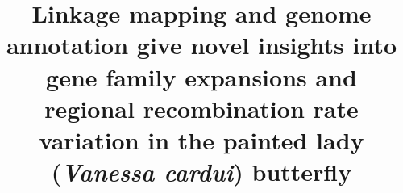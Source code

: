 \documentclass[twocolumn]{bmcart}%
\begin{document}
\begin{frontmatter}
\begin{fmbox}
\title{
{
 Linkage mapping and genome annotation give novel insights into gene family expansions and regional recombination rate variation in the painted 
lady ({\it Vanessa cardui}) butterfly
}
}
\author[
  addressref={aff1,aff2}, 
   noteref={n1},%
  email={daria.shipilina@ebc.uu.se}   %
]{ }
\author[
  addressref={aff1},
  noteref={n1},
  email={karin.nasvall@ebc.uu.se}
]{ }
\author[
  addressref={aff1},
  email={lars.hook@ebc.uu.se}
]{ }
\author[
  addressref={aff3},
  email={roger.vila@csic.es}
]{ }
\author[
  addressref={aff4},
  email={gerard.talavera@csic.es}
]{ }
\author[
  addressref={aff1},
  email={niclas.backstrom@ebc.uu.se}
]{ }



\address[id=aff1]{%
  ,           
  ,           ,
  ,                              %
}
\address[id=aff2]{
  ,
   ,
  ,
  ,                              %
}
\address[id=aff3]{
  ,
  ,
   ,
  ,
  ,                              %
}
\address[id=aff4]{
  ,
   ,
  ,
  ,                              %
}


\end{fmbox}
\end{frontmatter}
\end{document}

